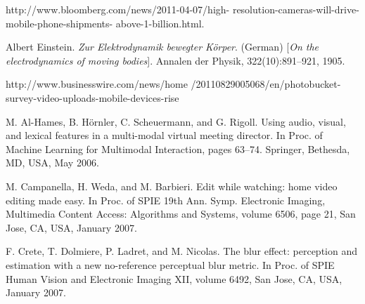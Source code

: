 \documentclass{sig-alternate}
\begin{document}
\begin{thebibliography}{9}
http://www.bloomberg.com/news/2011-04-07/high-
resolution-cameras-will-drive-mobile-phone-shipments-
above-1-billion.html.

Albert Einstein. 
\textit{Zur Elektrodynamik bewegter K{\"o}rper}. (German) 
[\textit{On the electrodynamics of moving bodies}]. 
Annalen der Physik, 322(10):891–921, 1905.

http://www.businesswire.com/news/home
/20110829005068/en/photobucket-survey-video-uploads-mobile-devices-rise


M. Al-Hames, B. Hörnler, C. Scheuermann, and G. Rigoll.
Using audio, visual, and lexical features in a multi-modal
virtual meeting director. In Proc. of Machine Learning for
Multimodal Interaction, pages 63–74. Springer, Bethesda,
MD, USA, May 2006.


M. Campanella, H. Weda, and M. Barbieri. Edit while
watching: home video editing made easy. In Proc. of SPIE
19th Ann. Symp. Electronic Imaging, Multimedia Content
Access: Algorithms and Systems, volume 6506, page 21, San
Jose, CA, USA, January 2007.

F. Crete, T. Dolmiere, P. Ladret, and M. Nicolas. The blur
effect: perception and estimation with a new no-reference
perceptual blur metric. In Proc. of SPIE Human Vision and
Electronic Imaging XII, volume 6492, San Jose, CA, USA,
January 2007.

\end{thebibliography}
\end{document}
